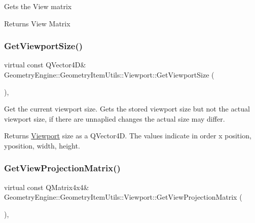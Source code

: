 Gets the View matrix \begin{DoxyReturn}{Returns}
View Matrix 
\end{DoxyReturn}
\mbox{\label{class_geometry_engine_1_1_geometry_item_utils_1_1_viewport_a0b5e2284b8a56be19d9f39a1b88c5eba}} 
\subsubsection{\texorpdfstring{GetViewportSize()}{GetViewportSize()}}
{\footnotesize\ttfamily virtual const Q\+Vector4D\& Geometry\+Engine\+::\+Geometry\+Item\+Utils\+::\+Viewport\+::\+Get\+Viewport\+Size (\begin{DoxyParamCaption}{ }\end{DoxyParamCaption})\hspace{0.3cm}{\ttfamily [inline]}, {\ttfamily [virtual]}}

Get the current viewport size. Gets the stored viewport size but not the actual viewport size, if there are unnaplied changes the actual size may differ. \begin{DoxyReturn}{Returns}
\mbox{\hyperlink{class_geometry_engine_1_1_geometry_item_utils_1_1_viewport}{Viewport}} size as a Q\+Vector4D. The values indicate in order x position, yposition, width, height. 
\end{DoxyReturn}
\mbox{\label{class_geometry_engine_1_1_geometry_item_utils_1_1_viewport_a026573276a6c7523adf0a2024597da46}} 
\subsubsection{\texorpdfstring{GetViewProjectionMatrix()}{GetViewProjectionMatrix()}}
{\footnotesize\ttfamily virtual const Q\+Matrix4x4\& Geometry\+Engine\+::\+Geometry\+Item\+Utils\+::\+Viewport\+::\+Get\+View\+Projection\+Matrix (\begin{DoxyParamCaption}{ }\end{DoxyParamCaption})\hspace{0.3cm}{\ttfamily [inline]}, {\ttfamily [virtual]}}


